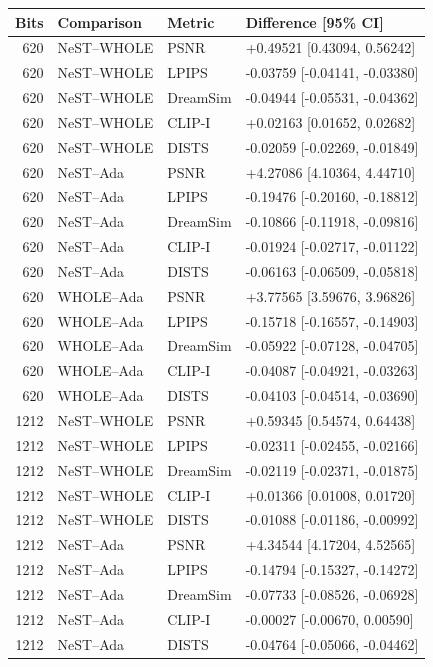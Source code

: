 \documentclass[10pt,letterpaper]{article}
\begin{document}
\begin{longtable}{@{}rlll@{}}\toprule
Bits & Comparison & Metric & Difference [95\% CI]\\\midrule\endhead
620 & NeST--WHOLE & PSNR & +0.49521 [0.43094, 0.56242]\\
620 & NeST--WHOLE & LPIPS & -0.03759 [-0.04141, -0.03380]\\
620 & NeST--WHOLE & DreamSim & -0.04944 [-0.05531, -0.04362]\\
620 & NeST--WHOLE & CLIP-I & +0.02163 [0.01652, 0.02682]\\
620 & NeST--WHOLE & DISTS & -0.02059 [-0.02269, -0.01849]\\
620 & NeST--Ada & PSNR & +4.27086 [4.10364, 4.44710]\\
620 & NeST--Ada & LPIPS & -0.19476 [-0.20160, -0.18812]\\
620 & NeST--Ada & DreamSim & -0.10866 [-0.11918, -0.09816]\\
620 & NeST--Ada & CLIP-I & -0.01924 [-0.02717, -0.01122]\\
620 & NeST--Ada & DISTS & -0.06163 [-0.06509, -0.05818]\\
620 & WHOLE--Ada & PSNR & +3.77565 [3.59676, 3.96826]\\
620 & WHOLE--Ada & LPIPS & -0.15718 [-0.16557, -0.14903]\\
620 & WHOLE--Ada & DreamSim & -0.05922 [-0.07128, -0.04705]\\
620 & WHOLE--Ada & CLIP-I & -0.04087 [-0.04921, -0.03263]\\
620 & WHOLE--Ada & DISTS & -0.04103 [-0.04514, -0.03690]\\
1212 & NeST--WHOLE & PSNR & +0.59345 [0.54574, 0.64438]\\
1212 & NeST--WHOLE & LPIPS & -0.02311 [-0.02455, -0.02166]\\
1212 & NeST--WHOLE & DreamSim & -0.02119 [-0.02371, -0.01875]\\
1212 & NeST--WHOLE & CLIP-I & +0.01366 [0.01008, 0.01720]\\
1212 & NeST--WHOLE & DISTS & -0.01088 [-0.01186, -0.00992]\\
1212 & NeST--Ada & PSNR & +4.34544 [4.17204, 4.52565]\\
1212 & NeST--Ada & LPIPS & -0.14794 [-0.15327, -0.14272]\\
1212 & NeST--Ada & DreamSim & -0.07733 [-0.08526, -0.06928]\\
1212 & NeST--Ada & CLIP-I & -0.00027 [-0.00670, 0.00590]\\
1212 & NeST--Ada & DISTS & -0.04764 [-0.05066, -0.04462]\\

\end{longtable}
\end{document}
